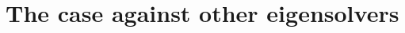 \documentclass[10pt, a4paper, twocolumn]{article} %
\begin{document}
\section{The case against other eigensolvers}


\printbibliography[title={Bibliography}] %

\end{document}
